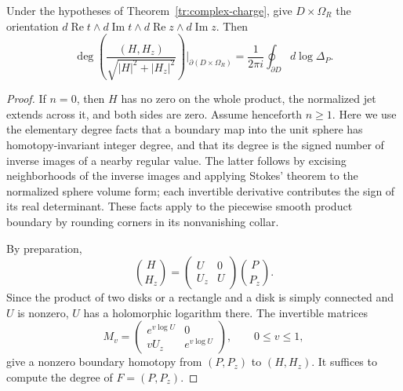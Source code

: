 \begin{proposition}
\label{tr:degree-agreement}
Under the hypotheses of Theorem~\ref{tr:complex-charge}, give
$D\times\Omega_R$ the orientation
$d\operatorname{Re}t\wedge d\operatorname{Im}t
 \wedge d\operatorname{Re}z\wedge d\operatorname{Im}z$.
Then
\begin{equation}\label{tr:degree-formula}
 \deg\left(\frac{(H,H_z)}{\sqrt{|H|^2+|H_z|^2}}\right)
                  \bigg|_{\partial(D\times\Omega_R)}
       =\frac1{2\pi i}\oint_{\partial D}d\log\Delta_P.
\end{equation}
\end{proposition}

\begin{proof}
If $n=0$, then $H$ has no zero on the whole product, the normalized
jet extends across it, and both sides are zero.  Assume henceforth
$n\geq1$.  Here we use the elementary degree facts that a boundary map into the
unit sphere has homotopy-invariant integer degree, and that its degree
is the signed number of inverse images of a nearby regular value.
The latter follows by excising neighborhoods of the inverse images and
applying Stokes' theorem to the normalized sphere volume form; each
invertible derivative contributes the sign of its real determinant.
These facts apply to the piecewise smooth product boundary by rounding
corners in its nonvanishing collar.

By preparation,
\[
 \binom H{H_z}=
 \begin{pmatrix}U&0\\ U_z&U\end{pmatrix}\binom P{P_z}.
\]
Since the product of two disks or a rectangle and a disk is simply
connected and $U$ is nonzero, $U$ has a holomorphic logarithm there.
The invertible matrices
\[
 M_v=\begin{pmatrix}e^{v\log U}&0\\ vU_z&e^{v\log U}\end{pmatrix},
                         \qquad 0\leq v\leq1,
\]
give a nonzero boundary homotopy from $(P,P_z)$ to $(H,H_z)$.
It suffices to compute the degree of $F=(P,P_z)$.


\end{proof}
